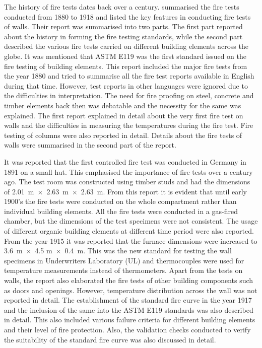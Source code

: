 The history of fire tests dates back over a century. \citet{Babrauskas1978} summarised the fire tests conducted from 1880 to 1918 and listed the key features in conducting fire tests of walls. Their report was summarised into two parts. The first part reported about the history in forming the fire testing standards, while the second part described the various fire tests carried on different building elements across the globe. It was mentioned that ASTM E119 was the first standard issued on the fire testing of building elements. This report included the major fire tests from the year 1880 and tried to summarise all the fire test reports available in English during that time. However, test reports in other languages were ignored due to the difficulties in interpretation. The need for fire proofing on steel, concrete and timber elements back then was debatable and the necessity for the same was explained. The first report explained in detail about the very first fire test on walls and the difficulties in measuring the temperatures during the fire test. Fire testing of columns were also reported in detail. Details about the fire tests of walls were summarised in the second part of the report.  

It was reported that the first controlled fire test was conducted in Germany in 1891 on a small hut. This emphasised the importance of fire tests over a century ago. The test room was constructed using timber studs and had the dimensions of 2.01~m~$\times$~2.63~m~$\times$~2.63~m. From this report it is evident that until early 1900's the fire tests were conducted on the whole compartment rather than individual building elements. All the fire tests were conducted in a gas-fired chamber, but the dimensions of the test specimens were not consistent. The usage of different organic building elements at different time period were also reported. From the year 1915 it was reported that the furnace dimensions were increased to 3.6~m~$\times$~4.5 m~$\times$~0.4~m. This was the new standard for testing the wall specimens in Underwriters Laboratory (UL) and thermocouples were used for temperature measurements instead of thermometers. Apart from the tests on walls, the report also elaborated the fire tests of other building components such as doors and openings. However, temperature distribution across the wall was not reported in detail. The establishment of the standard fire curve in the year 1917 and the inclusion of the same into the ASTM E119 standards was also described in detail. This also included various failure criteria for different building elements and their level of fire protection. Also, the validation checks conducted to verify the suitability of the standard fire curve was also discussed in detail.

